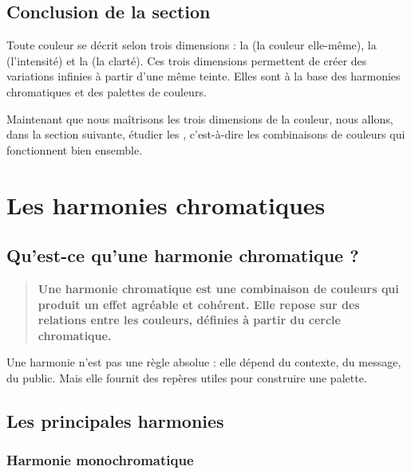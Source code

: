 \subsection*{Conclusion de la section}

\begin{retenir}
Toute couleur se décrit selon trois dimensions : la  (la couleur elle-même), la  (l'intensité) et la  (la clarté). Ces trois dimensions permettent de créer des variations infinies à partir d'une même teinte. Elles sont à la base des harmonies chromatiques et des palettes de couleurs.
\end{retenir}

Maintenant que nous maîtrisons les trois dimensions de la couleur, nous allons, dans la section suivante, étudier les , c'est-à-dire les combinaisons de couleurs qui fonctionnent bien ensemble.

\section{Les harmonies chromatiques}

\subsection{Qu'est-ce qu'une harmonie chromatique ?}

\begin{quote}
\textbf{Une harmonie chromatique est une combinaison de couleurs qui produit un effet agréable et cohérent. Elle repose sur des relations entre les couleurs, définies à partir du cercle chromatique.}
\end{quote}

Une harmonie n'est pas une règle absolue : elle dépend du contexte, du message, du public. Mais elle fournit des repères utiles pour construire une palette.

\subsection{Les principales harmonies}

\subsubsection{Harmonie monochromatique}

